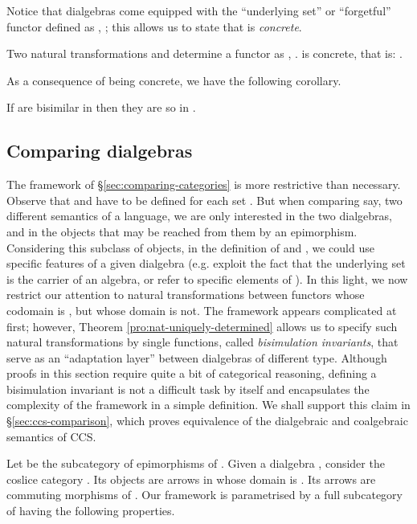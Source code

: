 \documentclass[orivec]{llncs}
\newcommand{\defend}{}
\renewenvironment{theorem}{\begin{thm}}{\defend\end{thm}}
\renewenvironment{corollary}{\begin{cor}}{\defend\end{cor}}
\begin{document}
Notice that dialgebras come equipped with the ``underlying set'' or ``forgetful'' functor  defined as , ; this allows us to state that  is \emph{concrete}.

\begin{theorem}{\label{thm:general-comparisons}}
	Two natural transformations  and  determine a functor  as , .  is concrete, that is: . 
\end{theorem}	
	
As a consequence of  being concrete, we have the following corollary.

\begin{corollary}
	If  are bisimilar in  then they are so in .
\end{corollary}

\subsection{Comparing dialgebras}
\label{sec:specific-comparisons}

The framework of \S \ref{sec:comparing-categories} is more restrictive than necessary. Observe that  and  have to be defined for each set . But when comparing say, two different semantics of a language, we are only interested in the two dialgebras, and in the objects that may be reached from them by an epimorphism. Considering this subclass of objects, in the definition of  and , we could use specific features of a given dialgebra (e.g. exploit the fact that the underlying set  is the carrier of an algebra, or refer to specific elements of ).
In this light, we now restrict our attention to natural transformations between functors whose codomain is , but whose domain is not. The framework appears complicated at first; however, Theorem \ref{pro:nat-uniquely-determined} allows us to specify such natural transformations by single functions, called \emph{bisimulation invariants}, that serve as an ``adaptation layer'' between dialgebras of different type.
Although proofs in this section require quite a bit of categorical reasoning, defining a bisimulation invariant is not a difficult task by itself and encapsulates the complexity of the framework in a simple definition. We shall support this claim in \S \ref{sec:ccs-comparison}, which proves equivalence of the dialgebraic and coalgebraic semantics of CCS. 



Let  be the subcategory of epimorphisms of . Given a dialgebra , consider the coslice category . Its objects are arrows in  whose domain is . Its arrows are commuting morphisms of . Our framework is parametrised by a full subcategory of  having the following properties.
\end{document}
